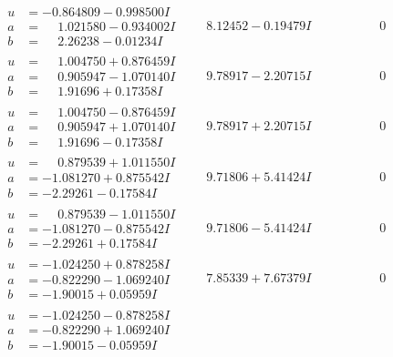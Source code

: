 \documentclass[1p]{elsarticle_modified}
\theoremstyle{definition}
\begin{document}
$$\begin{array}{c|c|c}
\begin{aligned}
u &= -0.864809 - 0.998500 I \\
a &= \phantom{-}1.021580 - 0.934002 I \\
b &= \phantom{-}2.26238 - 0.01234 I\end{aligned}
 & \phantom{-}8.12452 - 0.19479 I & \phantom{-0.000000 } 0 \\ \hline\begin{aligned}
u &= \phantom{-}1.004750 + 0.876459 I \\
a &= \phantom{-}0.905947 - 1.070140 I \\
b &= \phantom{-}1.91696 + 0.17358 I\end{aligned}
 & \phantom{-}9.78917 - 2.20715 I & \phantom{-0.000000 } 0 \\ \hline\begin{aligned}
u &= \phantom{-}1.004750 - 0.876459 I \\
a &= \phantom{-}0.905947 + 1.070140 I \\
b &= \phantom{-}1.91696 - 0.17358 I\end{aligned}
 & \phantom{-}9.78917 + 2.20715 I & \phantom{-0.000000 } 0 \\ \hline\begin{aligned}
u &= \phantom{-}0.879539 + 1.011550 I \\
a &= -1.081270 + 0.875542 I \\
b &= -2.29261 - 0.17584 I\end{aligned}
 & \phantom{-}9.71806 + 5.41424 I & \phantom{-0.000000 } 0 \\ \hline\begin{aligned}
u &= \phantom{-}0.879539 - 1.011550 I \\
a &= -1.081270 - 0.875542 I \\
b &= -2.29261 + 0.17584 I\end{aligned}
 & \phantom{-}9.71806 - 5.41424 I & \phantom{-0.000000 } 0 \\ \hline\begin{aligned}
u &= -1.024250 + 0.878258 I \\
a &= -0.822290 - 1.069240 I \\
b &= -1.90015 + 0.05959 I\end{aligned}
 & \phantom{-}7.85339 + 7.67379 I & \phantom{-0.000000 } 0 \\ \hline\begin{aligned}
u &= -1.024250 - 0.878258 I \\
a &= -0.822290 + 1.069240 I \\
b &= -1.90015 - 0.05959 I\end{aligned}

\end{array}$$
\end{document}
